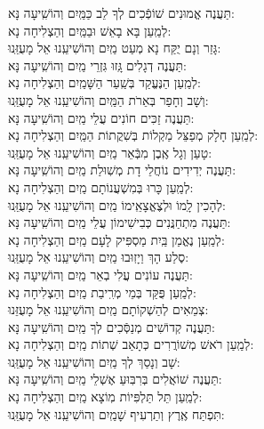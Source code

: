 \documentclass[twoside, openany, parskip=half, 11pt]{book}
\begin{document}
\begin{small}
תַּעֲנֶה אֱמוּנִים שׁוֹפְֿכִים לְךָ לֵב כַּמַּֽיִם 		\hfill				וְהוֹשִֽׁיעָה נָּא:\\
לְמַֽעַן בָּא בָאֵשׁ וּבַמַּֽיִם 					\hfill			וְהַצְלִיחָה נָא: \\
	גָּזַר וְנָם יֻקַּח נָא מְעַט מַֽיִם 				 \hfill וְהוֹשִׁיעֵֽנוּ אֵל מָעֻזֵּֽנוּ:\\
תַּעֲנֶה דְגָלִים גָּֽזוּ גִּזְרֵי מַֽיִם 				\hfill			וְהוֹשִֽׁיעָה נָּא:\\
לְמַֽעַן הַנֶּעֱקַד בְּשַֽׁעַר הַשָּׁמַֽיִם 				\hfill			וְהַצְלִיחָה נָא:\\
	וְשָׁב וְחָפַר בְּאֵרֹת הַמַּֽיִם 				\hfill	 וְהוֹשִׁיעֵֽנוּ אֵל מָעֻזֵּֽנוּ:\\
תַּעֲנֶה זַכִּים חוֹנִים עֲלֵי מַֽיִם 				\hfill			וְהוֹשִֽׁיעָה נָּא:\\
לְמַֽעַן חָלָק מְפַצֵּל מַקְלוֹת בְּשִׁקֲתוֹת הַמַּֽיִם 		\hfill			וְהַצְלִיחָה נָא:\\
	טָעַן וְגָל אֶֽבֶן מִבְּֿאֵר מַֽיִם 				\hfill	 וְהוֹשִׁיעֵֽנוּ אֵל מָעֻזֵּֽנוּ:\\
תַּעֲנֶה יְדִידִים נוֹחֲלֵי דָת מְשֽׁוּלַת מַֽיִם 				\hfill		וְהוֹשִֽׁיעָה נָּא: \\
לְמַֽעַן כָּרוּ בְּמִשְׁעֲנוֹתָם מַֽיִם 					\hfill		וְהַצְלִיחָה נָא:\\
	לְהָכִין לָֽמוֹ וּלְצֶאֱצָאֵֽימוֹ מַֽיִם 			\hfill		 וְהוֹשִׁיעֵֽנוּ אֵל מָעֻזֵּֽנוּ:\\
תַּעֲנֶה מִתְחַנֲּנִים כְּבִישִׁימוֹן עֲלֵי מַֽיִם 		\hfill				וְהוֹשִֽׁיעָה נָּא:\\
לְמַֽעַן נֶאֱמַן בַּֽיִת מַסְפִּיק לָעָם מַֽיִם 		\hfill				וְהַצְלִיחָה נָא:\\
	סֶלַע הָךְ וַיָזֽוּבוּ מַֽיִם 					\hfill	 וְהוֹשִׁיעֵֽנוּ אֵל מָעֻזֵּֽנוּ: \\
תַּעֲנֶה עוֹנִים עֲלִי בְאֵר מַֽיִם 			\hfill				וְהוֹשִֽׁיעָה נָּא: \\
לְמַֽעַן פֻּקַּד בְּמֵי מְרִֽיבַת מַֽיִם 			\hfill				וְהַצְלִיחָה נָא:\\
	צְמֵאִים לְהַשְׁקוֹתָם מַֽיִם 			\hfill		וְהוֹשִׁיעֵֽנוּ אֵל מָעֻזֵּנוּ: \\
תַּעֲנֶה קְדוֹשִׁים מְנַסְּֿכִים לְךָ מַֽיִם 			\hfill			וְהוֹשִֽׁיעָה נָּא: \\
לְמַֽעַן רֹאשׁ מְשׁוֹרֲרִים כְּתָאַב שְׁתוֹת מַֽיִם 		\hfill			וְהַצְלִיחָה נָא:\\
	שָׁב וְנָסַךְ לְךָ מַֽיִם 				\hfill		 וְהוֹשִׁיעֵֽנוּ אֵל מָעֻזֵּֽנוּ:\\
תַּעֲנֶה שׁוֹאֲלִים בְּרִבּֽוּעַ אֶשְׁלֵי מַֽיִם 			\hfill			וְהוֹשִֽׁיעָה נָּא: \\
לְמַֽעַן תֵּל תַּלְפִּיוֹת מֽוֹצָא מַֽיִם 				\hfill			וְהַצְלִיחָה נָא:\\
	תִּפְתַּח אֶֽרֶץ וְתַרְעִיף שָׁמַֽיִם 			\hfill		 וְהוֹשִׁיעֵֽנוּ אֵל מָעֻזֵּֽנוּ:
	
\end{small}
\end{document}
